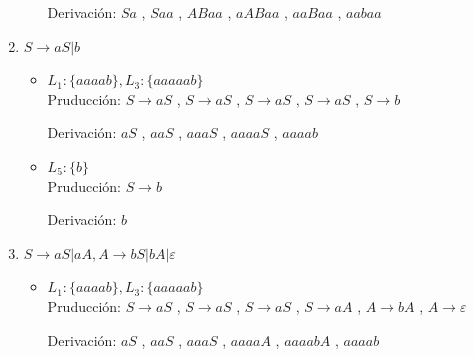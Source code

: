 \documentclass{article}
\begin{document}
\begin{enumerate}
\begin{itemize}
                        Derivación: 
                        $ Sa $ ,
                        $ Saa $ ,
                        $ ABaa $ ,
                        $ aABaa $ ,
                        $ aaBaa $ ,
                        $ aabaa $    
                \end{itemize} 
            
            \item   $S \to aS|b$
                \begin{itemize}
                    \item $ L_1 : \{aaaab\},  L_3 : \{aaaaab\}$ \\
                        Pruducción: 
                        $ S \to aS $ ,
                        $ S \to aS $ ,
                        $ S \to aS $ ,
                        $ S \to aS $ ,
                        $ S \to b $
                        
                        Derivación:
                        $ aS $ ,
                        $ aaS $ ,
                        $ aaaS $ ,
                        $ aaaaS $ ,
                        $ aaaab $
                        
                    \item $ L_5 : \{b\}$ \\
                        Pruducción: 
                        $ S \to b $
                        
                        Derivación:
                        $ b $   
                \end{itemize}
            
            \item   $S \to aS|aA, A \to bS|bA|\varepsilon$ 
                \begin{itemize}
                    \item $ L_1 : \{aaaab\},  L_3 : \{aaaaab\}$ \\
                        Pruducción: 
                        $ S \to aS $ ,
                        $ S \to aS $ ,
                        $ S \to aS $ ,
                        $ S \to aA $ ,
                        $ A \to bA $ ,
                        $ A \to \varepsilon $ 
                        
                        Derivación:
                        $ aS $ ,
                        $ aaS $ ,
                        $ aaaS $ ,
                        $ aaaaA $ ,
                        $ aaaabA $ ,
                        $ aaaab $
                    

\end{itemize}
\end{enumerate}
\end{document}
